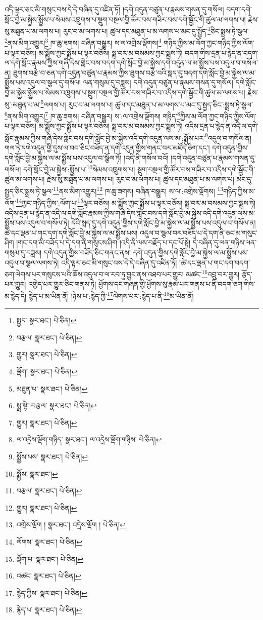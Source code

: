 འདི་ལྟར་ཅང་མི་གསུང་བས་དེ་དེ་བཞིན་དུ་འཛིན་ཏོ། །དགེ་འདུན་བཙུན་པ་རྣམས་གསན་དུ་གསོལ། བདག་དགེ་སློང་བྱེ་མ་སྐྱེས་སྨྱོས་པ་སེམས་འཁྲུགས་པ་སྡུག་བསྔལ་གྱི་ཚོར་བས་གཟིར་བས་དགེ་སྦྱོང་གི་ཚུལ་མ་ལགས་པ། རྗེས་སུ་མཐུན་པ་མ་ལགས་པ། རུང་བ་མ་ལགས་པ། ཚུལ་དང་མཐུན་པ་མ་ལགས་པ་མང་དུ་སྤྱོད་\footnote{སྤྱད་  སྣར་ཐང་།  པེ་ཅིན། }ཅིང་སྨྲས་ཏེ་སྩལ་\footnote{བརྩལ་  སྣར་ཐང་།  པེ་ཅིན། }ནས་མིག་འགྱུར།\footnote{གྱུར།  སྣར་ཐང་།  པེ་ཅིན། } ཁ་ཆུ་ཟགས། བཞིན་བསྒྱུར། ས་ལ་འགྲེས་ལྡོགས།\footnote{ལྡོག།  སྣར་ཐང་།  པེ་ཅིན། } གཉིད་ཀྱིས་མ་ལོག་ཀྱང་གཉིད་ཀྱིས་ལོག་པ་ལྟར་བཅོས། མ་སྨྱོས་ཀྱང་སྨྱོས་པ་ལྟར་བཅོས། སྨྲ་བར་མ་བསམས་ཀྱང་སྨྲས་ཏེ། བདག་གིས་དྲན་པ་རྙེད་ན་བདག་ལ་དགེ་སློང་རྣམས་ཀྱིས་གཞི་དེས་གླེང་བས་བདག་དགེ་སློང་བྱེ་མ་སྐྱེས་དགེ་འདུན་ལ་མ་སྨྱོས་པས་འདུལ་བ་གསོལ་ན། ཐུགས་བརྩེ་བ་ཅན་དགེ་འདུན་བཙུན་པ་རྣམས་ཀྱིས་ཐུགས་བརྩེ་བའི་སླད་དུ་བདག་དགེ་སློང་བྱེ་མ་སྐྱེས་ལ་མ་སྨྱོས་པས་འདུལ་བ་སྩལ་དུ་གསོལ། ལན་གསུམ་དུ་བཟླས། དགེ་འདུན་བཙུན་པ་རྣམས་གསན་དུ་གསོལ། དགེ་སློང་བྱེ་མ་སྐྱེས་སྨྱོས་པ་སེམས་འཁྲུགས་པ་སྡུག་བསྔལ་གྱི་ཚོར་བས་གཟིར་བ་འདིས་དགེ་སྦྱོང་གི་ཚུལ་མ་ལགས་པ། རྗེས་སུ་:མཐུན་པ་མ་\footnote{མཐུན་པ་  སྣར་ཐང་།  པེ་ཅིན། }ལགས་པ། རུང་བ་མ་ལགས་པ། ཚུལ་དང་མཐུན་པ་མ་ལགས་པ་མང་དུ་སྤྱད་ཅིང་:སྨྲས་ཏེ་སྩལ་\footnote{སྨྲ་སྟེ། བརྩལ་  སྣར་ཐང་།  པེ་ཅིན། }ནས་མིག་འགྱུར།\footnote{གྱུར།  སྣར་ཐང་།  པེ་ཅིན། } ཁ་ཆུ་ཟགས། བཞིན་བསྒྱུར། ས་:ལ་འགྲེས་ལྡོགས། གཉིད་\footnote{ལ་འདྲེས་ལྡོག་གཉིད་  སྣར་ཐང་། ལ་འདྲེས་ལྡོག་གཉིས་  པེ་ཅིན། }ཀྱིས་མ་ལོག་ཀྱང་གཉིད་ཀྱིས་ལོག་པ་ལྟར་བཅོས། མ་སྨྱོས་ཀྱང་སྨྱོས་པ་ལྟར་བཅོས། སྨྲ་བར་མ་བསམས་ཀྱང་སྨྲས་ཏེ། འདིས་དྲན་པ་རྙེད་ན་འདི་ལ་དགེ་སློང་རྣམས་ཀྱིས་གཞི་དེས་གླེང་བས་དགེ་སློང་བྱེ་མ་སྐྱེས་འདི་དགེ་འདུན་ལས་མ་:སྨྱོས་པར་\footnote{སྨྱོས་པས་  སྣར་ཐང་།  པེ་ཅིན། }འདུལ་བ་གསོལ་ན། གལ་ཏེ་དགེ་འདུན་གྱི་དུས་ལ་བབ་ཅིང་བཟོད་ན་དགེ་འདུན་གྱིས་གནང་བར་མཛོད་ཅིག་དང་། དགེ་འདུན་གྱིས་དགེ་སློང་བྱེ་མ་སྐྱེས་ལ་མ་སྨྱོས་པས་འདུལ་བ་སྩོལ་ཏོ། །འདི་ནི་གསོལ་བའོ། །དགེ་འདུན་བཙུན་པ་རྣམས་གསན་དུ་གསོལ། དགེ་སློང་བྱེ་མ་སྐྱེས་:སྨྱོས་པ་\footnote{སྨྱོས་  སྣར་ཐང་། }སེམས་འཁྲུགས་པ། སྡུག་བསྔལ་གྱི་ཚོར་བས་གཟིར་བ་འདིས་དགེ་སྦྱོང་གི་ཚུལ་མ་ལགས་པ། རྗེས་སུ་མཐུན་པ་མ་ལགས་པ། རུང་བ་མ་ལགས་པ། ཚུལ་དང་མཐུན་པ་མ་ལགས་པ། མང་དུ་སྤྱད་ཅིང་སྨྲས་ཏེ་སྩལ་\footnote{བརྩལ་  སྣར་ཐང་།  པེ་ཅིན། }ནས་མིག་འགྱུར།\footnote{གྱུར།  སྣར་ཐང་།  པེ་ཅིན། } ཁ་ཆུ་ཟགས། བཞིན་བསྒྱུར། ས་ལ་:འགྲེས་ལྡོགས། \footnote{འགྲེས་ལྡོག །  སྣར་ཐང་། འདྲེས་ལྡོག །  པེ་ཅིན། }གཉིད་ཀྱིས་མ་ལོག་\footnote{ལོགས་  སྣར་ཐང་།  པེ་ཅིན། }ཀྱང་གཉིད་ཀྱིས་:ལོག་པ་\footnote{ལྡོག་པ་  སྣར་ཐང་།  པེ་ཅིན། }ལྟར་བཅོས། མ་སྨྱོས་ཀྱང་སྨྱོས་པ་ལྟར་བཅོས། སྨྲ་བར་མ་བསམས་ཀྱང་སྨྲས་ཏེ། འདིས་དྲན་པ་རྙེད་ན་འདི་ལ་དགེ་སློང་རྣམས་ཀྱིས་གཞི་དེས་གླེང་བས་དགེ་སློང་བྱེ་མ་སྐྱེས་འདི་དགེ་འདུན་ལས་མ་སྨྱོས་པས་འདུལ་བ་གསོལ་ཏེ། དེའི་སླད་དུ་དགེ་འདུན་གྱིས་དགེ་སློང་བྱེ་མ་སྐྱེས་ལ་མ་སྨྱོས་པས་འདུལ་བ་གསོལ་ན། ཚེ་དང་ལྡན་པ་གང་དག་དགེ་སློང་བྱེ་མ་སྐྱེས་ལ་མ་སྨྱོས་པས། འདུལ་བ་སྩལ་བར་བཟོད་པ་དེ་དག་ནི་ཅང་མ་གསུང་ཤིག །གང་དག་མི་བཟོད་པ་དེ་དག་ནི་གསུངས་ཤིག །འདི་ནི་ལས་བརྗོད་པ་དང་པོ་སྟེ། དེ་བཞིན་དུ་ལན་གཉིས་ལན་གསུམ་དུ་བཟླས། དགེ་འདུན་གྱིས་བཟོད་ཅིང་གནང་ནས། དགེ་འདུན་གྱིས་དགེ་སློང་བྱེ་མ་སྐྱེས་ལ་མ་སྨྱོས་པས་འདུལ་བ་སྩལ་ལགས་ཏེ། འདི་ལྟར་ཅང་མི་གསུང་བས་དེ་དེ་བཞིན་དུ་འཛིན་ཏོ། །ཚེ་དང་ལྡན་པ་གང་དག་བདག་ཅག་ལེགས་པར་གསུངས་པའི་ཆོས་འདུལ་བ་ལ་རབ་ཏུ་བྱུང་ནས་འཐབ་པར་གྱུར། མཚང་\footnote{འཚང་  སྣར་ཐང་།  པེ་ཅིན། }འབྲུ་བར་གྱུར། རྩོད་པར་གྱུར། འགྱེད་པར་གྱུར་ཅིང་གནས་ཏེ། ཕྱོགས་དང་གཞན་གྱི་ཕྱོགས་སུ་རྣམ་པར་གནས་པ་ནི་བདག་ཅག་གིས་མ་རྙེད་དེ། རྙེད་པ་མ་ཡིན་ནོ། །ཉེས་པ་:རྙེད་ཀྱི་\footnote{རྙེད་ཀྱིས་  སྣར་ཐང་།  པེ་ཅིན། }ལེགས་པར་:རྙེད་པ་ནི་\footnote{རྙེད་པ་  སྣར་ཐང་།  པེ་ཅིན། }མ་ཡིན་ནོ། 